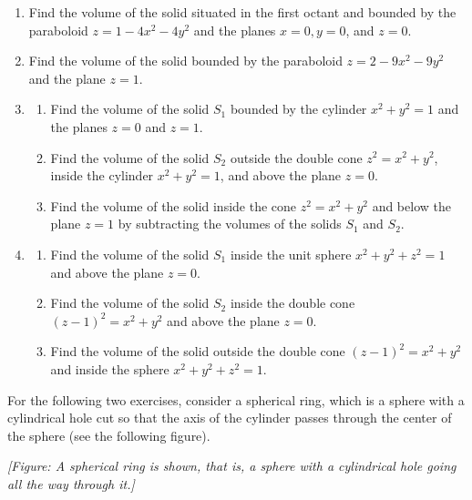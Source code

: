\documentclass{exercises}
\begin{document}
\begin{enumerate}[resume]
\item Find the volume of the solid situated in the first octant and bounded by the paraboloid $z=1-4x^{2}-4y^{2}$ and the planes $x=0,y=0$, and $z=0$.
\item Find the volume of the solid bounded by the paraboloid $z=2-9x^{2}-9y^{2}$ and the plane $z=1$.
\item 
\begin{enumerate}[label=(\alph*)]
  \item Find the volume of the solid $S_{1}$ bounded by the cylinder $x^{2}+y^{2}=1$ and the planes $z=0$ and $z=1$.
  \item Find the volume of the solid $S_{2}$ outside the double cone $z^{2}=x^{2}+y^{2}$, inside the cylinder $x^{2}+y^{2}=1$, and above the plane $z=0$.
  \item Find the volume of the solid inside the cone $z^{2}=x^{2}+y^{2}$ and below the plane $z=1$ by subtracting the volumes of the solids $S_{1}$ and $S_{2}$.
\end{enumerate}
\item 
\begin{enumerate}[label=(\alph*)]
  \item Find the volume of the solid $S_{1}$ inside the unit sphere $x^{2}+y^{2}+z^{2}=1$ and above the plane $z=0$.
  \item Find the volume of the solid $S_{2}$ inside the double cone $(z-1)^{2}=x^{2}+y^{2}$ and above the plane $z=0$.
  \item Find the volume of the solid outside the double cone $(z-1)^{2}=x^{2}+y^{2}$ and inside the sphere $x^{2}+y^{2}+z^{2}=1$.
\end{enumerate}
\end{enumerate}

For the following two exercises, consider a spherical ring, which is a sphere with a cylindrical hole cut so that the axis of the cylinder passes through the center of the sphere (see the following figure).


\textit{[Figure: A spherical ring is shown, that is, a sphere with a cylindrical hole going all the way through it.]}
\end{document}
